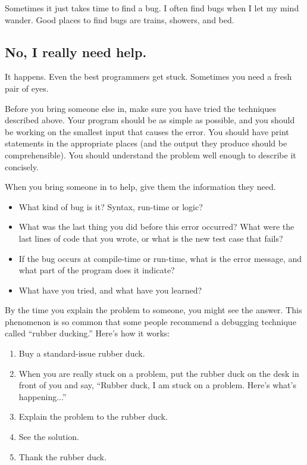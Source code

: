 \documentclass[12pt]{book}
\theoremstyle{definition}
\begin{document}
Sometimes it just takes time to find a bug.  I often find bugs when I
let my mind wander.  Good places to find bugs are trains, showers, and
bed.


\subsection*{No, I really need help.}

It happens.  Even the best programmers get stuck.
Sometimes you need a fresh pair of eyes.

Before you bring someone else in, make sure you have tried
the techniques described above.  Your program should be as simple
as possible, and you should be working on the smallest input
that causes the error.  You should have print statements in the
appropriate places (and the output they produce should be
comprehensible).  You should understand the problem well enough
to describe it concisely.

When you bring someone in to help, give
them the information they need.

\begin{itemize}

\item What kind of bug is it?  Syntax, run-time or logic?

\item What was the last thing you did before this error occurred?
What were the last lines of code that you wrote, or what is
the new test case that fails?

\item If the bug occurs at compile-time or run-time, what is
the error message, and what part of the program does it indicate?

\item What have you tried, and what have you learned? 

\end{itemize}

By the time you explain the problem
to someone, you might see the answer.  This phenomenon
is so common that some people recommend a debugging technique
called ``rubber ducking.''  Here's how it works:

\begin{enumerate}

\item Buy a standard-issue rubber duck.

\item When you are really stuck on a problem, put the rubber
duck on the desk in front of you and say, ``Rubber duck, I
am stuck on a problem.  Here's what's happening...''

\item Explain the problem to the rubber duck.

\item See the solution.

\item Thank the rubber duck.

\end{enumerate}
\end{document}
